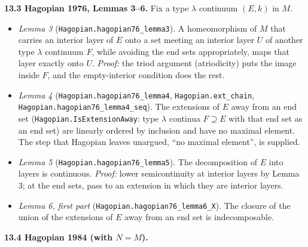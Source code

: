 \documentclass[11pt]{article}
\newcommand{\lean}[1]{\texttt{#1}}
\begin{document}
\textbf{13.3 Hagopian 1976, Lemmas 3--6.} Fix a type $\lambda$ continuum $(E, k)$ in $M$.

\begin{itemize}
  \item \emph{Lemma 3} (\lean{Hagopian.\hspace{0pt}hagopian76\_\hspace{0pt}lemma3}). A homeomorphism of $M$ that carries an interior layer of $E$ onto a set meeting an interior layer $U$ of another type $\lambda$ continuum $F$, while avoiding the end sets appropriately, maps that layer exactly onto $U$. \emph{Proof:} the triod argument (atriodicity) puts the image inside $F$, and the empty-interior condition does the rest.
  \item \emph{Lemma 4} (\lean{Hagopian.\hspace{0pt}hagopian76\_\hspace{0pt}lemma4}, \lean{Hagopian.\hspace{0pt}ext\_\hspace{0pt}chain}, \lean{Hagopian.\hspace{0pt}hagopian76\_\hspace{0pt}lemma4\_\hspace{0pt}seq}). The extensions of $E$ away from an end set (\lean{Hagopian.\hspace{0pt}IsExtensionAway}: type $\lambda$ continua $F \supseteq E$ with that end set as an end set) are linearly ordered by inclusion and have no maximal element. The step that Hagopian leaves unargued, ``no maximal element'', is supplied.
  \item \emph{Lemma 5} (\lean{Hagopian.\hspace{0pt}hagopian76\_\hspace{0pt}lemma5}). The decomposition of $E$ into layers is continuous. \emph{Proof:} lower semicontinuity at interior layers by Lemma 3; at the end sets, pass to an extension in which they are interior layers.
  \item \emph{Lemma 6, first part} (\lean{Hagopian.\hspace{0pt}hagopian76\_\hspace{0pt}lemma6\_\hspace{0pt}X}). The closure of the union of the extensions of $E$ away from an end set is indecomposable.
\end{itemize}

\textbf{13.4 Hagopian 1984 (with $N = M$).}
\end{document}

